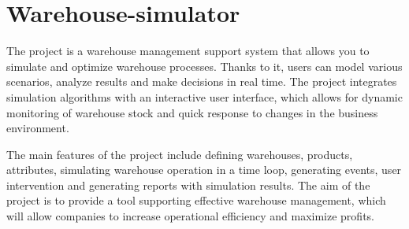 \chapter{Warehouse-\/simulator}
\hypertarget{md__r_e_a_d_m_e}{}\label{md__r_e_a_d_m_e}
\label{md__r_e_a_d_m_e_autotoc_md0}%
%
 The   project is a warehouse management support system that allows you to simulate and optimize warehouse processes. Thanks to it, users can model various scenarios, analyze results and make decisions in real time. The project integrates simulation algorithms with an interactive user interface, which allows for dynamic monitoring of warehouse stock and quick response to changes in the business environment.

The main features of the project include defining warehouses, products, attributes, simulating warehouse operation in a time loop, generating events, user intervention and generating reports with simulation results. The aim of the project is to provide a tool supporting effective warehouse management, which will allow companies to increase operational efficiency and maximize profits. 